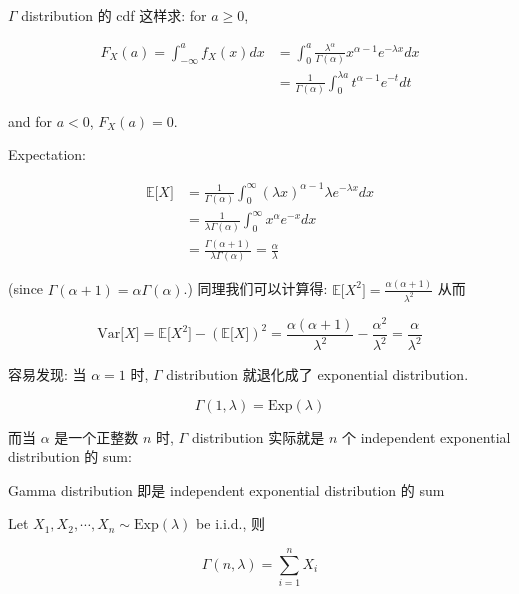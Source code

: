 \documentclass{qlnotes-export}
\begin{document}
\(\Gamma\) distribution 的 cdf 这样求: for \(a \geq 0\),

\[\begin{matrix}
{F_{X}(a) = \int_{- \infty}^{a}f_{X}(x) dx} & {= \int_{0}^{a}\frac{\lambda^{\alpha}}{\Gamma(\alpha)}x^{\alpha - 1}e^{- \lambda x} dx} \\
 & {= \frac{1}{\Gamma(\alpha)}\int_{0}^{\lambda a}t^{\alpha - 1}e^{- t} dt}
\end{matrix}\]

and for \(a < 0\), \(F_{X}(a) = 0\).

Expectation:

\[\begin{matrix}
{{\mathbb{E}}\lbrack X\rbrack} & {= \frac{1}{\Gamma(\alpha)}\int_{0}^{\infty}(\lambda x)^{\alpha - 1}\lambda e^{- \lambda x} dx} \\
 & {= \frac{1}{\lambda\Gamma(\alpha)}\int_{0}^{\infty}x^{\alpha}e^{- x} dx} \\
 & {= \frac{\Gamma(\alpha + 1)}{\lambda\Gamma(\alpha)} = \frac{\alpha}{\lambda}}
\end{matrix}\]

(since \(\Gamma(\alpha + 1) = \alpha\Gamma(\alpha)\).) 同理我们可以计算得: \({\mathbb{E}}\lbrack X^{2}\rbrack = \frac{\alpha(\alpha + 1)}{\lambda^{2}}\) 从而

\[\text{Var}\lbrack X\rbrack = {\mathbb{E}}\lbrack X^{2}\rbrack - ({\mathbb{E}}\lbrack X\rbrack)^{2} = \frac{\alpha(\alpha + 1)}{\lambda^{2}} - \frac{\alpha^{2}}{\lambda^{2}} = \frac{\alpha}{\lambda^{2}}\]

容易发现: 当 \(\alpha = 1\) 时, \(\Gamma\) distribution 就退化成了 exponential distribution.

\[\Gamma(1,\lambda) = \text{Exp}(\lambda)\]

而当 \(\alpha\) 是一个正整数 \(n\) 时, \(\Gamma\) distribution 实际就是 \(n\) 个 independent exponential distribution 的 sum:

\begin{proposition}{Gamma distribution 即是 independent exponential distribution 的 sum}\label{prop-02-random-variables-gamma-distribution-independent-exponential-distribution-su}

Let \(X_{1},X_{2},\cdots,X_{n} \sim \text{Exp}(\lambda)\) be i.i.d., 则

\[\Gamma(n,\lambda) = \sum\limits_{i = 1}^{n}X_{i}\]

\end{proposition}
\end{document}
